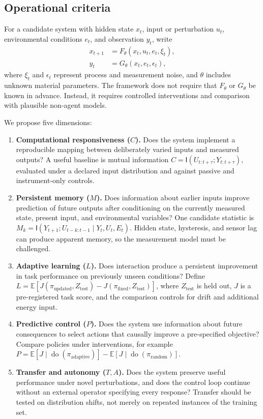\documentclass[11pt]{article}
\newcommand{\doop}{\operatorname{do}}
\newcommand{\E}{\mathbb{E}}
\newcommand{\MI}{\mathsf{I}}
\begin{document}
\subsection{Operational criteria}

For a candidate system with hidden state $x_t$, input or perturbation $u_t$, environmental conditions $e_t$, and observation $y_t$, write
\begin{align}
  x_{t+1} &= F_{\theta}(x_t,u_t,e_t,\xi_t), \\
  y_t &= G_{\theta}(x_t,e_t,\epsilon_t),
\end{align}
where $\xi_t$ and $\epsilon_t$ represent process and measurement noise, and $\theta$ includes unknown material parameters. The framework does not require that $F_\theta$ or $G_\theta$ be known in advance. Instead, it requires controlled interventions and comparison with plausible non-agent models.

We propose five dimensions:
\begin{enumerate}
  \item \textbf{Computational responsiveness ($C$).} Does the system implement a reproducible mapping between deliberately varied inputs and measured outputs? A useful baseline is mutual information $C=\MI(U_{t:t+\tau};Y_{t:t+\tau})$, evaluated under a declared input distribution and against passive and instrument-only controls.
  \item \textbf{Persistent memory ($M$).} Does information about earlier inputs improve prediction of future outputs after conditioning on the currently measured state, present input, and environmental variables? One candidate statistic is $M_k=\MI(Y_{t+1};U_{t-k:t-1}\mid Y_t,U_t,E_t)$. Hidden state, hysteresis, and sensor lag can produce apparent memory, so the measurement model must be challenged.
  \item \textbf{Adaptive learning ($L$).} Does interaction produce a persistent improvement in task performance on previously unseen conditions? Define $L=\E[J(\pi_{\mathrm{updated}},Z_{\mathrm{test}})-J(\pi_{\mathrm{fixed}},Z_{\mathrm{test}})]$, where $Z_{\mathrm{test}}$ is held out, $J$ is a pre-registered task score, and the comparison controls for drift and additional energy input.
  \item \textbf{Predictive control ($P$).} Does the system use information about future consequences to select actions that causally improve a pre-specified objective? Compare policies under interventions, for example $P=\E[J\mid\doop(\pi_{\mathrm{adaptive}})]-\E[J\mid\doop(\pi_{\mathrm{random}})]$.
  \item \textbf{Transfer and autonomy ($T,A$).} Does the system preserve useful performance under novel perturbations, and does the control loop continue without an external operator specifying every response? Transfer should be tested on distribution shifts, not merely on repeated instances of the training set.
\end{enumerate}
\end{document}

